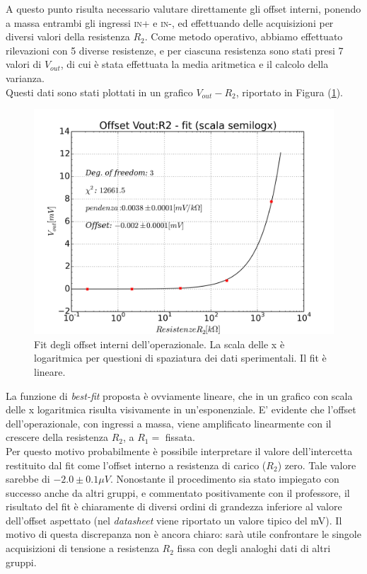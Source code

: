 \documentclass[journal, a4paper]{IEEEtran}
\begin{document}
A questo punto risulta necessario valutare direttamente gli offset interni, ponendo a massa entrambi gli ingressi \textsc{in+} e \textsc{in-}, ed effettuando delle acquisizioni per diversi valori della resistenza $R_2$. Come metodo operativo, abbiamo effettuato rilevazioni con 5 diverse resistenze, e per ciascuna resistenza sono stati presi 7 valori di $V_{out}$, di cui è stata effettuata la media aritmetica e il calcolo della varianza. \\
Questi dati sono stati plottati in un grafico $V_{out} - R_2$, riportato in Figura (\ref{fig:fit_offset}).\\


\begin{figure}
\centering
\includegraphics[width=0.9\linewidth]{./fit_offset}
\caption{Fit degli offset interni dell'operazionale. La scala delle x è logaritmica per questioni di spaziatura dei dati sperimentali. Il fit è lineare.}
\label{fig:fit_offset}
\end{figure}

La funzione di \textit{best-fit} proposta è ovviamente lineare, che in un grafico con scala delle x logaritmica risulta visivamente in un'esponenziale. E' evidente che l'offset dell'operazionale, con ingressi a massa, viene amplificato linearmente con il crescere della resistenza $R_2$, a $R_1 = $ fissata.\\

Per questo motivo probabilmente è possibile interpretare il valore dell'intercetta restituito dal fit come l'offset interno a resistenza di carico ($R_2$) zero. Tale valore sarebbe di $-2.0 \pm 0.1 \mu \si{V} $. Nonostante il procedimento sia stato impiegato con successo anche da altri gruppi, e commentato positivamente con il professore, il risultato del fit è chiaramente di diversi ordini di grandezza inferiore al valore dell'offset aspettato (nel \textit{datasheet} viene riportato un valore tipico del \si{mV}). Il motivo di questa discrepanza non è ancora chiaro: sarà utile confrontare le singole acquisizioni di tensione a resistenza $R_2$ fissa con degli analoghi dati di altri gruppi.
\end{document}
